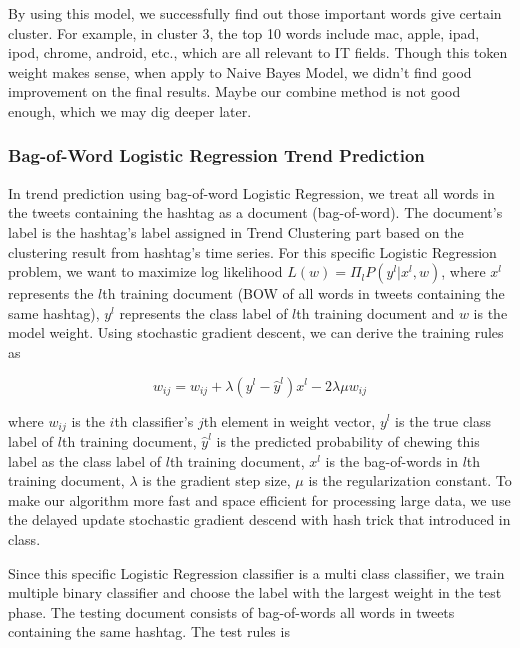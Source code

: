 \documentclass{article}
\begin{document}
By using this model, we successfully find out those important words give certain cluster. For example, in cluster 3, the top 10 words include mac, apple, ipad, ipod, chrome, android, etc., which are all relevant to IT fields. Though this token weight makes sense, when apply to Naive Bayes Model, we didn't find good improvement on the final results. Maybe our combine method is not good enough, which we may dig deeper later.

\subsubsection{Bag-of-Word Logistic Regression Trend Prediction}

In trend prediction using bag-of-word Logistic Regression, we treat all words in the tweets containing the hashtag as a document (bag-of-word). The document's label is the hashtag's label assigned in Trend Clustering part based on the clustering result from hashtag's time series. For this specific Logistic Regression problem, we want to maximize log likelihood $L(w)=\Pi_lP(y^l|x^l,w)$, where $x^l$ represents the $l$th training document (BOW of all words in tweets containing the same hashtag), $y^l$ represents the class label of $l$th training document and $w$ is the model weight. Using stochastic gradient descent, we can derive the training rules as 

\begin{equation} 
w_{ij}=w_{ij} + \lambda(y^l - \hat{y}^l) x^l - 2\lambda \mu w_{ij} \label{eq:lrtrain}
\end{equation}

where $w_{ij}$ is the $i$th classifier's $j$th element in weight vector, $y^l$ is the true class label of $l$th training document, $\hat{y}^l$ is the predicted probability of chewing this label as the class label of $l$th training document, $x^l$ is the bag-of-words in $l$th training document,  $\lambda$ is the gradient step size, $\mu$ is the regularization constant. To make our algorithm more fast and space efficient for processing large data, we use the delayed update stochastic gradient descend with hash trick that introduced in class. 

Since this specific Logistic Regression classifier is a multi class classifier, we train multiple binary classifier and choose the label with the largest weight in the test phase. The testing document consists of bag-of-words all words in tweets containing the same hashtag. The test rules is    
\end{document}

